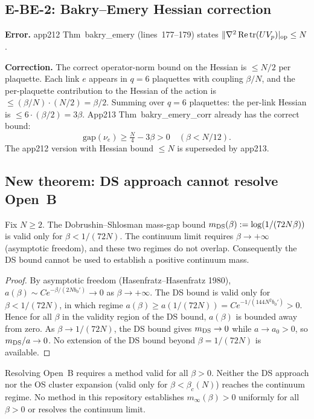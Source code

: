 \subsection{E-BE-2: Bakry--Emery Hessian correction}
\label{ssec:be2}

\textbf{Error.} app212 Thm~bakry\_emery (lines~177--179) states
$\|\nabla^2\operatorname{Re}\operatorname{tr}(UV_p)|_{\rm op}\le N$.

\textbf{Correction.} The correct operator-norm bound on the Hessian is $\le N/2$ per plaquette.
Each link $e$ appears in $q=6$ plaquettes with coupling $\beta/N$,
and the per-plaquette contribution to the Hessian of the action is
$\le (\beta/N)\cdot(N/2)=\beta/2$.
Summing over $q=6$ plaquettes: the per-link Hessian is
$\le 6\cdot(\beta/2)=3\beta$.
App213 Thm~bakry\_emery\_corr already has the correct bound:
\begin{equation}
  \mathrm{gap}(\nu_e)\ge\tfrac{N}{4}-3\beta>0\quad(\beta<N/12).
\end{equation}
The app212 version with Hessian bound $\le N$ is superseded by app213.

\subsection{New theorem: DS approach cannot resolve Open~B}
\label{ssec:dob_fails}

\begin{theorem}
\label{thm:dob_fails}
Fix $N\ge 2$.
The Dobrushin--Shlosman mass-gap bound
$m_{\rm DS}(\beta):=\log(1/(72N\beta))$ is valid only for $\beta<1/(72N)$.
The continuum limit requires $\beta\to+\infty$ (asymptotic freedom),
and these two regimes do not overlap.
Consequently the DS bound cannot be used to establish a positive continuum mass.
\end{theorem}
\begin{proof}
By asymptotic freedom (Hasenfratz--Hasenfratz 1980),
$a(\beta)\sim C e^{-\beta/(2Nb_0')}\to 0$ as $\beta\to+\infty$.
The DS bound is valid only for $\beta<1/(72N)$,
in which regime
$a(\beta)\ge a(1/(72N))=Ce^{-1/(144N^2 b_0')}>0$.
Hence for all $\beta$ in the validity region of the DS bound,
$a(\beta)$ is bounded away from zero.
As $\beta\to 1/(72N)$, the DS bound gives $m_{\rm DS}\to 0$
while $a\to a_0>0$, so $m_{\rm DS}/a\to 0$.
No extension of the DS bound beyond $\beta=1/(72N)$ is available.
\end{proof}

\begin{corollary}
\label{cor:open_b_hard}
Resolving Open~B requires a method valid for all $\beta>0$.
Neither the DS approach nor the OS cluster expansion
(valid only for $\beta<\beta_c(N)$) reaches the continuum regime.
No method in this repository establishes $m_\infty(\beta)>0$
uniformly for all $\beta>0$ or resolves the continuum limit.
\end{corollary}

